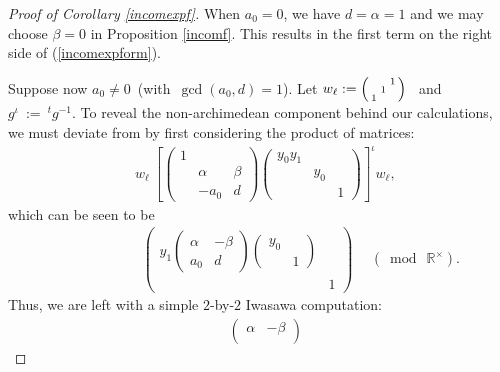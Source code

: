 \documentclass[11pt,reqno]{amsart}
\theoremstyle{definition}
\theoremstyle{definition}
\theoremstyle{remark}
\newcommand{\R}{\ensuremath{\mathbb{R}}}
\numberwithin{equation}{section}
\begin{document}
 
 \begin{proof}[Proof of Corollary \ref{incomexpf}]
 When $a_{0}=0$,  we have $d= \alpha=1$ and we may choose $\beta=0$ in Proposition \ref{incomf}. This results in the first term on the right side of (\ref{incomexpform}). 
 
 Suppose now $a_{0}\neq 0$\,  (with\,  $\gcd(a_{0},d)=1$).  Let   $w_{\ell}:= \begin{psmallmatrix}
 	&      & 1\\
 	& 1   &   \\
 	1	 &      & 
 \end{psmallmatrix}$ \ and \ $g^{\iota}\ := \ ^{t}g^{-1}$.  To reveal the non-archimedean component behind our calculations,  we must deviate from \cite{Kw23} by first  considering the product of matrices:
 \begin{align*}
 	\hspace{10pt} w_{\ell} \ \left[ 
 	\begin{pmatrix}
 		1 &            &         \\
 		& \alpha & \beta \\
 		& -a_{0} & d
 	\end{pmatrix}
 	\begin{pmatrix}
 		y_{0}y_{1}&  & \\
 		& y_{0} & \\
 		&           & 1
 	\end{pmatrix}  \right]^{\iota} w_{\ell},
 \end{align*}
which can be seen to be  
\begin{align*}
\hspace{70pt} 	\begin{pmatrix}
		y_{1}
		\begin{pmatrix}
			\alpha & -\beta \\
			a_{0}   & d
		\end{pmatrix}
		\begin{pmatrix}
			y_{0} & \\
			& 1
		\end{pmatrix}
		& \\
		& 1
	\end{pmatrix} \hspace{15pt}   (\bmod\  \R^{\times}).
\end{align*}
Thus, we are  left with a simple $2$-by-$2$ Iwasawa computation: 
\begin{align}\label{2by2Iwa}
\hspace{10pt} \begin{pmatrix}
	\alpha & -\beta \\

\end{pmatrix}
\end{align}
\end{proof}
\end{document}
